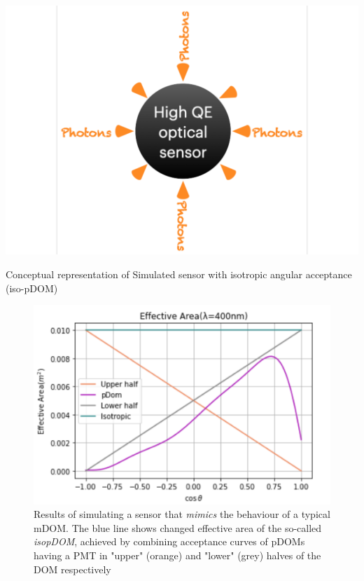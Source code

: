 \begin{marginfigure}
    \includegraphics{./figures/gen2/iso-pDOM.pdf}
    \caption[Schematic of an isoPDOM]{Conceptual representation of Simulated sensor with isotropic angular acceptance (iso-pDOM)}
\end{marginfigure}

\begin{figure}
    \includegraphics{./figures/gen2/isopDOM_eff_area.png}
    \caption[Effective area of isoPDOM]{Results of simulating a sensor that \emph{mimics} the behaviour of a typical mDOM. The blue line shows changed effective area of the so-called \emph{isopDOM}, achieved by combining acceptance curves of pDOMs having a PMT in "upper" (orange) and "lower" (grey) halves of the DOM respectively}
\end{figure}


